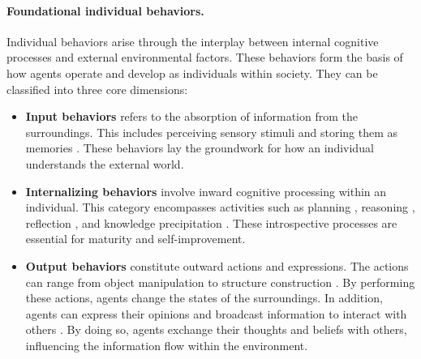 \paragraph{Foundational individual behaviors.}
Individual behaviors arise through the interplay between internal cognitive processes and external environmental factors. These behaviors form the basis of how agents operate and develop as individuals within society. They can be classified into three core dimensions:
\begin{itemize}[leftmargin=*]
    \item \textbf{Input behaviors} refers to the absorption of information from the surroundings. This includes perceiving sensory stimuli \cite{DBLP:conf/icml/DriessXSLCIWTVY23} and storing them as memories \cite{DBLP:journals/corr/abs-2303-11366}. These behaviors lay the groundwork for how an individual understands the external world.
    \item \textbf{Internalizing behaviors} involve inward cognitive processing within an individual. This category encompasses activities such as planning \cite{DBLP:journals/corr/abs-2304-11477}, reasoning \cite{DBLP:conf/nips/Wei0SBIXCLZ22}, reflection \cite{DBLP:conf/iclr/YaoZYDSN023}, and knowledge precipitation \cite{DBLP:journals/corr/abs-2303-17760,DBLP:journals/corr/abs-2308-00352}. These introspective processes are essential for maturity and self-improvement.
    \item \textbf{Output behaviors} constitute outward actions and expressions. The actions can range from object manipulation \cite{DBLP:conf/icml/DriessXSLCIWTVY23} to structure construction \cite{DBLP:journals/corr/abs-2305-16291}. By performing these actions, agents change the states of the surroundings. In addition, agents can express their opinions and broadcast information to interact with others \cite{DBLP:journals/corr/abs-2308-00352}. By doing so, agents exchange their thoughts and beliefs with others, influencing the information flow within the environment.
\end{itemize}

